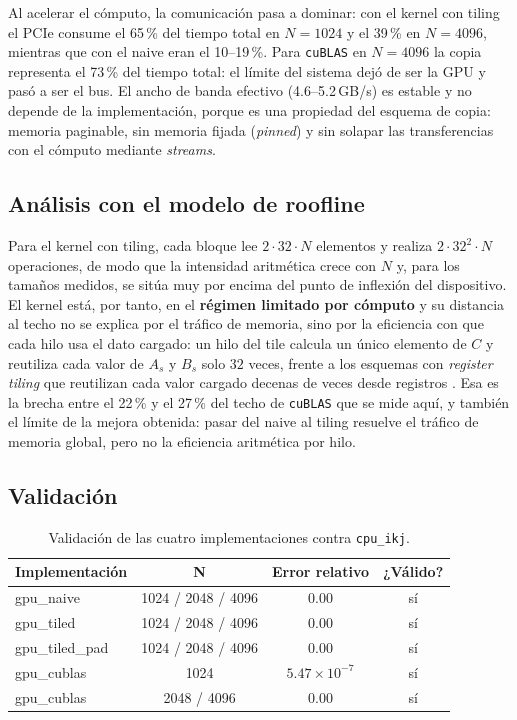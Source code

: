 	Al acelerar el cómputo, la comunicación pasa a dominar: con el kernel con tiling el PCIe consume el 65\,\% del tiempo total en $N=1024$ y el 39\,\% en $N=4096$, mientras que con el naive eran el 10--19\,\%. Para \texttt{cuBLAS} en $N=4096$ la copia representa el 73\,\% del tiempo total: el límite del sistema dejó de ser la GPU y pasó a ser el bus. El ancho de banda efectivo (4.6--5.2\,GB/s) es estable y no depende de la implementación, porque es una propiedad del esquema de copia: memoria paginable, sin memoria fijada (\textit{pinned}) y sin solapar las transferencias con el cómputo mediante \textit{streams}.

\subsection{Análisis con el modelo de roofline}

	Para el kernel con tiling, cada bloque lee $2 \cdot 32 \cdot N$ elementos y realiza $2 \cdot 32^2 \cdot N$ operaciones, de modo que la intensidad aritmética crece con $N$ y, para los tamaños medidos, se sitúa muy por encima del punto de inflexión del dispositivo. El kernel está, por tanto, en el \textbf{régimen limitado por cómputo} y su distancia al techo no se explica por el tráfico de memoria, sino por la eficiencia con que cada hilo usa el dato cargado: un hilo del tile calcula un único elemento de $C$ y reutiliza cada valor de $A_s$ y $B_s$ solo $32$ veces, frente a los esquemas con \textit{register tiling} que reutilizan cada valor cargado decenas de veces desde registros \cite{williams2009}. Esa es la brecha entre el 22\,\% y el 27\,\% del techo de \texttt{cuBLAS} que se mide aquí, y también el límite de la mejora obtenida: pasar del naive al tiling resuelve el tráfico de memoria global, pero no la eficiencia aritmética por hilo.

\subsection{Validación}

	\begin{table}[H]
		\centering
		\caption{Validación de las cuatro implementaciones contra \texttt{cpu\_ikj}.}
		\begin{tabular}{lccc}
			\hline
			\textbf{Implementación} & \textbf{N} & \textbf{Error relativo} & \textbf{¿Válido?} \bigstrut\\
			\hline
			gpu\_naive & 1024 / 2048 / 4096 & 0.00 & sí \\
			gpu\_tiled & 1024 / 2048 / 4096 & 0.00 & sí \\
			gpu\_tiled\_pad & 1024 / 2048 / 4096 & 0.00 & sí \\
			gpu\_cublas & 1024 & $5.47 \times 10^{-7}$ & sí \\
			gpu\_cublas & 2048 / 4096 & 0.00 & sí \bigstrut[b]\\
			\hline
		\end{tabular}
		\label{tab:validacion-u3}
	\end{table}

